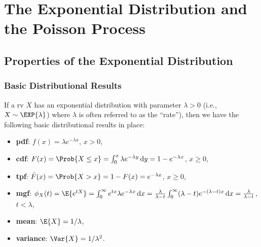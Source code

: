 \chapter{The Exponential Distribution and the Poisson Process}
\section{Properties of the Exponential Distribution}
\subsection*{Basic Distributional Results}
If a rv $ X $ has an exponential distribution with parameter $ \lambda>0 $ (i.e., $ X \sim \EXP{\lambda} $)
where $ \lambda $ is often referred to as the ``rate''), then we have the following basic distributional results in place:
\begin{itemize}
    \item \textbf{pdf}: $ f(x)=\lambda e^{-\lambda x} $, $ x>0 $,
    \item \textbf{cdf}: $ F(x)=\Prob{X\le x}=\int_{0}^{x}\lambda e^{-\lambda y}\odif{y}=1-e^{-\lambda x} $, $ x\ge 0 $,
    \item \textbf{tpf}: $ \bar{F}(x)=\Prob{X>x}=1-F(x)=e^{-\lambda x} $, $ x\ge 0 $,
    \item \textbf{mgf}: $ \phi_X(t)=\E{e^{tX}}
              =\int_{0}^{\infty}e^{tx}\lambda e^{-\lambda x}\odif{x}
              =\frac{\lambda}{\lambda-t}\int_{0}^{\infty}(\lambda-t)e^{-(\lambda-t)x}\odif{x}
              =\frac{\lambda}{\lambda-t} $, $ t<\lambda $,
    \item \textbf{mean}: $ \E{X}=1/\lambda $,
    \item \textbf{variance}: $ \Var{X}=1/\lambda^2 $.
\end{itemize}
